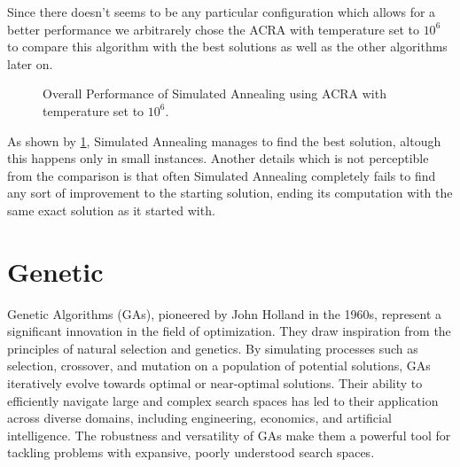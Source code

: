 Since there doesn't seems to be any particular configuration which allows for a better performance we arbitrarely chose the ACRA with temperature set to $10^6$ to compare this algorithm with the best solutions as well as the other algorithms later on.

\begin{figure}[htbp]
	\centering
	\caption{Overall Performance of Simulated Annealing using ACRA with temperature set to $10^6$.}
    \label{fig:annealingCost}
\end{figure}

As shown by \figurename{ \ref{fig:annealingCost}}, Simulated Annealing manages to find the best solution, altough this happens only in small instances.
Another details which is not perceptible from the comparison is that often Simulated Annealing completely fails to find any sort of improvement to the starting solution, ending its computation with the same exact solution as it started with.

\newpage

\section{Genetic}

Genetic Algorithms (GAs), pioneered by John Holland in the 1960s, represent a significant innovation in the field of optimization.
They draw inspiration from the principles of natural selection and genetics.
By simulating processes such as selection, crossover, and mutation on a population of potential solutions, GAs iteratively evolve towards optimal or near-optimal solutions.
Their ability to efficiently navigate large and complex search spaces has led to their application across diverse domains, including engineering, economics, and artificial intelligence.
The robustness and versatility of GAs make them a powerful tool for tackling problems with expansive, poorly understood search spaces.

